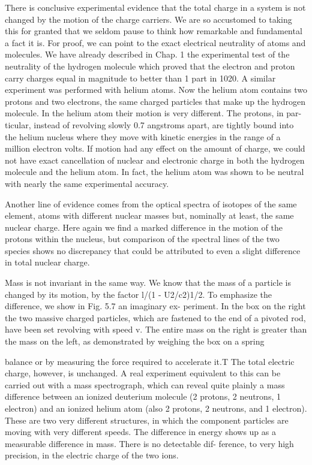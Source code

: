 There is conclusive experimental evidence that the total charge in
a system is not changed by the motion of the charge carriers. We
are so accustomed to taking this for granted that we seldom pause
to think how remarkable and fundamental a fact it is. For proof,
we can point to the exact electrical neutrality of atoms and molecules.
We have already described in Chap. 1 the experimental test of the
neutrality of the hydrogen molecule which proved that the electron
and proton carry charges equal in magnitude to better than 1 part
in 1020. A similar experiment was performed with helium atoms.
Now the helium atom contains two protons and two electrons, the
same charged particles that make up the hydrogen molecule. In the
helium atom their motion is very different. The protons, in par-
ticular, instead of revolving slowly 0.7 angstroms apart, are tightly
bound into the helium nucleus where they move with kinetic energies
in the range of a million electron volts. If motion had any effect on
the amount of charge, we could not have exact cancellation of nuclear
and electronic charge in both the hydrogen molecule and the helium
atom. In fact, the helium atom was shown to be neutral with nearly
the same experimental accuracy.

Another line of evidence comes from the optical spectra of isotopes
of the same element, atoms with different nuclear masses but,
nominally at least, the same nuclear charge. Here again we find a
marked difference in the motion of the protons within the nucleus,
but comparison of the spectral lines of the two species shows no discrepancy
that could be attributed to even a slight difference in total
nuclear charge.

Mass is not invariant in the same way. We know that the mass of
a particle is changed by its motion, by the factor l/(1 - U2/c2)1/2.
To emphasize the difference, we show in Fig. 5.7 an imaginary ex-
periment. In the box on the right the two massive charged particles,
which are fastened to the end of a pivoted rod, have been set revolving
with speed v. The entire mass on the right is greater than the
mass on the left, as demonstrated by weighing the box on a spring

balance or by measuring the force required to accelerate it.T The
total electric charge, however, is unchanged. A real experiment
equivalent to this can be carried out with a mass spectrograph, which
can reveal quite plainly a mass difference between an ionized deuterium
molecule (2 protons, 2 neutrons, 1 electron) and an ionized
helium atom (also 2 protons, 2 neutrons, and 1 electron). These are
two very different structures, in which the component particles are
moving with very different speeds. The difference in energy shows
up as a measurable difference in mass. There is no detectable dif-
ference, to very high precision, in the electric charge of the two ions.

